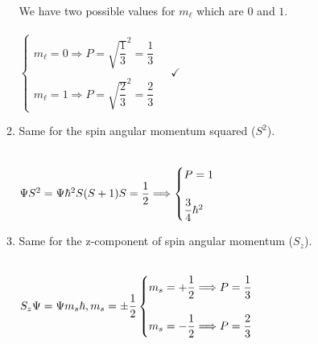 \documentclass[fleqn]{article}
\begin{document}
\begin{enumerate}
\begin{enumerate}
        \textcolor{hwColor}{
          \\
          We have two possible values for $m_{\ell}$ which are $0$ and $1$.
          \\
          \\
          $
            \begin{cases}
              m_{\ell}=0 \Longrightarrow P=\sqrt{\dfrac{1}{3}}^2=\dfrac{1}{3}
              \\
              \\
              m_{\ell}=1 \Longrightarrow P=\sqrt{\dfrac{2}{3}}^2=\dfrac{2}{3}
            \end{cases} ~~~~~ \checkmark
          $
          \\
        }

      \item Same for the spin angular momentum squared ($S^2$).

        \textcolor{hwColor}{
          \\
          $
            \Psi S^2=\Psi \hbar^2 S(S+1)
            \\
            \\
            S=\dfrac{1}{2} \Longrightarrow \begin{cases}
              P=1
              \\
              \\
              \dfrac{3}{4} \hbar^2
            \end{cases}
          $
          \\
        }

      \item Same for the z-component of spin angular momentum ($S_z$).

        \textcolor{hwColor}{
          \\
          $
            S_z \Psi=\Psi m_s \hbar, m_s=\pm\dfrac{1}{2}
            \\
            \\
            \begin{cases}
              m_s=+\dfrac{1}{2} \Longrightarrow P=\dfrac{1}{3}
              \\
              \\
              m_s=-\dfrac{1}{2} \Longrightarrow P=\dfrac{2}{3}
            \end{cases}
            \\
          $
        }

    \end{enumerate}
  \end{enumerate}
\end{document}

